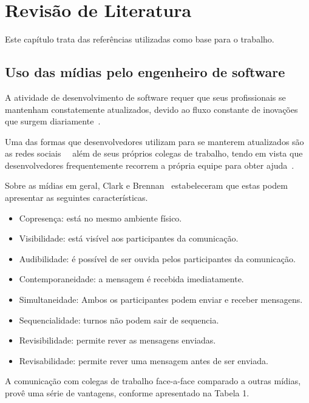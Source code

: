 \chapter{Revisão de Literatura}

Este capítulo trata das referências utilizadas como base para o trabalho.

\section{Uso das mídias pelo engenheiro de software}

A atividade de desenvolvimento de software requer que seus profissionais se mantenham constatemente atualizados, devido ao fluxo constante de inovações que surgem diariamente~\cite{Singer2014}.

Uma das formas que desenvolvedores utilizam para se manterem atualizados são as redes sociais~\cite{Treude2012}~\cite{Storey2014} além de seus próprios colegas de trabalho, tendo em vista que desenvolvedores frequentemente recorrem a própria equipe para obter ajuda~\cite{Weinberg1998}.

Sobre as mídias em geral, Clark e Brennan~\cite{Clark1991} estabeleceram que estas podem apresentar as seguintes características.

\begin{itemize}
  \item Copresença: está no mesmo ambiente físico.
  \item Visibilidade: está visível aos participantes da comunicação.
  \item Audibilidade: é possível de ser ouvida pelos participantes da comunicação.
  \item Contemporaneidade: a mensagem é recebida imediatamente.
  \item Simultaneidade: Ambos os participantes podem enviar e receber mensagens.
  \item Sequencialidade: turnos não podem sair de sequencia.
  \item Revisibilidade: permite rever as mensagens enviadas.
  \item Revisabilidade: permite rever uma mensagem antes de ser enviada.
\end{itemize}

A comunicação com colegas de trabalho face-a-face comparado a outras mídias, provê uma série de vantagens, conforme apresentado na Tabela 1.

